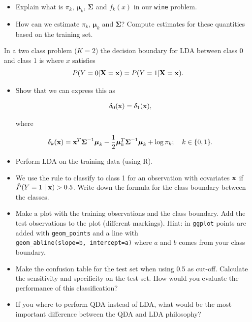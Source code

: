 \documentclass[]{article}
\providecommand{\tightlist}{%
  \setlength{\itemsep}{0pt}\setlength{\parskip}{0pt}}
\begin{document}
\begin{itemize}
\tightlist
\item
  Explain what is \(\pi_k\), \(\boldsymbol{\mu}_k\),
  \(\boldsymbol{\Sigma}\) and \(f_k(x)\) in our \texttt{wine} problem.
\item
  How can we estimate \(\pi_k\), \(\boldsymbol{\mu}_k\) and
  \(\boldsymbol{\Sigma}\)? Compute estimates for these quantities based
  on the training set.
\end{itemize}

In a two class problem (\(K=2\)) the decision boundary for LDA between
class 0 and class 1 is where \(x\) satisfies \[
P(Y=0 | {\bf X}={\bf x}) = P(Y=1 | {\bf X}={\bf x}).
\]

\begin{itemize}
\tightlist
\item
  Show that we can express this as

  \begin{align}
  \delta_0({\bf x}) &= \delta_1({\bf x}),
  \end{align}

  where

  \begin{align}
  \delta_k({\bf x}) &= {\bf x}^T \boldsymbol{\Sigma}^{-1}\boldsymbol{\mu}_k - \frac{1}{2}\boldsymbol{\mu}_k^T \boldsymbol{\Sigma}^{-1}\boldsymbol{\mu}_k + \log \pi_k; \quad k\in\{0,1\}.
  \end{align}
\item
  Perform LDA on the training data (using R).
\item
  We use the rule to classify to class 1 for an observation with
  covariates \({\bf x}\) if \(\hat{P}(Y=1\mid {\bf x})>0.5\). Write down
  the formula for the class boundary between the classes.
\item
  Make a plot with the training observations and the class boundary. Add
  the test observations to the plot (different markings). Hint: in
  \texttt{ggplot} points are added with \texttt{geom\_points} and a line
  with \texttt{geom\_abline(slope=b,\ intercept=a)} where \(a\) and
  \(b\) comes from your class boundary.
\item
  Make the confusion table for the test set when using 0.5 as cut-off.
  Calculate the sensitivity and specificity on the test set. How would
  you evaluate the performance of this classification?
\item
  If you where to perform QDA instead of LDA, what would be the most
  important difference between the QDA and LDA philosophy?
\end{itemize}
\end{document}
